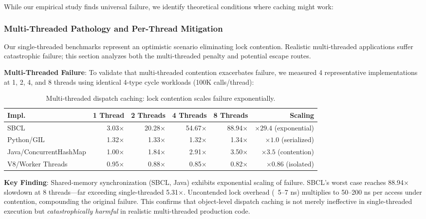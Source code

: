 \documentclass[sigplan,final,acmsmall,review,screen]{acmart}
\begin{document}
While our empirical study finds universal failure, we identify theoretical conditions where caching might work:

\subsubsection{Multi-Threaded Pathology and Per-Thread Mitigation}
\label{sec:per-thread-caching}

Our single-threaded benchmarks represent an optimistic scenario eliminating lock contention. Realistic multi-threaded applications suffer catastrophic failure; this section analyzes both the multi-threaded penalty and potential escape routes.

\textbf{Multi-Threaded Failure}: To validate that multi-threaded contention exacerbates failure, we measured 4 representative implementations at 1, 2, 4, and 8 threads using identical 4-type cycle workloads (100K calls/thread):

\begin{table}[h!]
\centering
\small
\caption{Multi-threaded dispatch caching: lock contention scales failure exponentially.}
\label{tab:multithreaded-scaling}
\begin{tabular}{@{}lrrrrr@{}}
\toprule
\textbf{Impl.} & \textbf{1 Thread} & \textbf{2 Threads} & \textbf{4 Threads} & \textbf{8 Threads} & \textbf{Scaling} \\
\midrule
SBCL & 3.03× & 20.28× & 54.67× & 88.94× & $\times29.4$ (exponential) \\
Python/GIL & 1.32× & 1.33× & 1.32× & 1.34× & $\times1.0$ (serialized) \\
Java/ConcurrentHashMap & 1.00× & 1.84× & 2.91× & 3.50× & $\times3.5$ (contention) \\
V8/Worker Threads & 0.95× & 0.88× & 0.85× & 0.82× & $\times0.86$ (isolated) \\
\midrule
\end{tabular}
\end{table}

\textbf{Key Finding}: Shared-memory synchronization (SBCL, Java) exhibits exponential scaling of failure. SBCL's worst case reaches 88.94× slowdown at 8 threads—far exceeding single-threaded 5.31×. Uncontended lock overhead (~5--7 ns) multiplies to 50--200 ns per access under contention, compounding the original failure. This confirms that object-level dispatch caching is not merely ineffective in single-threaded execution but \emph{catastrophically harmful} in realistic multi-threaded production code.
\end{document}
